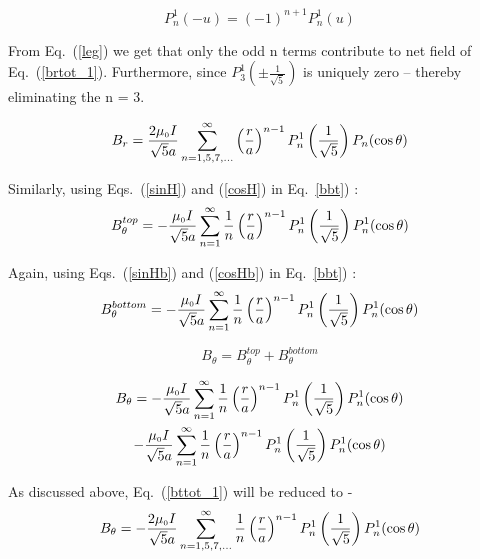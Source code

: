 \begin{equation}\label{leg}
P_n^1(-u)=(-1)^{n+1}P_n^1(u)
\end{equation}

From Eq.~(\ref{leg}) we get that only the odd n terms contribute to net field of Eq.~(\ref{brtot_1}). Furthermore, since \(P_3^1\left(\pm\frac{1}{\sqrt{5}}\right)\) is uniquely zero – thereby eliminating the n = 3.

\begin{equation}\label{brtotf}
B_r=\frac{2 \mu_{\scriptscriptstyle 0} I }{\sqrt{5}a}\sum_{n=1,5,7,...}^{\infty} \left(\frac{r}{a}\right)^{n-1}P_n^1\left(\frac{1}{\sqrt{5}}\right) P_n(\cos\theta)
\end{equation}

Similarly, using Eqs.~(\ref{sinH}) and (\ref{cosH}) in Eq.~\ref{bbt}) :
\begin{equation}\label{bbtH}
B_\theta^{top}=-\frac{\mu_{\scriptscriptstyle 0} I }{\sqrt{5}a}\sum_{n=1}^{\infty}\frac{1}{n} \left(\frac{r}{a}\right)^{n-1}P_n^1\left(\frac{1}{\sqrt{5}}\right) P_n^1(\cos\theta)
\end{equation}

Again, using Eqs.~(\ref{sinHb}) and (\ref{cosHb}) in Eq.~\ref{bbt}) :
\begin{equation}\label{bbtHb}
B_\theta^{bottom}=-\frac{\mu_{\scriptscriptstyle 0} I }{\sqrt{5}a}\sum_{n=1}^{\infty}\frac{1}{n} \left(\frac{r}{a}\right)^{n-1}P_n^1\left(\frac{1}{\sqrt{5}}\right) P_n^1(\cos\theta)
\end{equation}

\begin{equation}\label{bttot}
B_\theta=B_\theta^{top}+B_\theta^{bottom}
\end{equation}

\begin{multline}\label{bttot_1}
    B_\theta=-\frac{\mu_{\scriptscriptstyle 0} I }{\sqrt{5}a}\sum_{n=1}^{\infty}\frac{1}{n} \left(\frac{r}{a}\right)^{n-1}P_n^1\left(\frac{1}{\sqrt{5}}\right) P_n^1(\cos\theta) \\-\frac{\mu_{\scriptscriptstyle 0} I }{\sqrt{5}a}\sum_{n=1}^{\infty}\frac{1}{n} \left(\frac{r}{a}\right)^{n-1}P_n^1\left(\frac{1}{\sqrt{5}}\right) P_n^1(\cos\theta)
\end{multline}


As discussed above, Eq.~(\ref{bttot_1}) will be reduced to -
\begin{equation}\label{brtotf}
B_\theta=-\frac{2 \mu_{\scriptscriptstyle 0} I }{\sqrt{5}a}\sum_{n=1,5,7,...}^{\infty}
\frac{1}{n}\left(\frac{r}{a}\right)^{n-1}P_n^1\left(\frac{1}{\sqrt{5}}\right) P_n^1(\cos\theta)
\end{equation}



